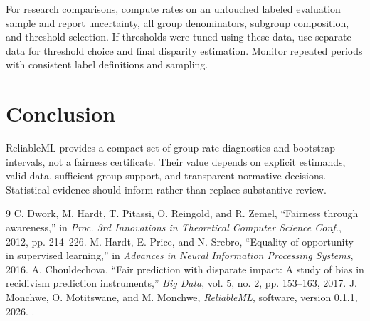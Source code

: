\documentclass[conference]{IEEEtran}
\begin{document}
For research comparisons, compute rates on an untouched labeled evaluation sample and report uncertainty, all group denominators, subgroup composition, and threshold selection. If thresholds were tuned using these data, use separate data for threshold choice and final disparity estimation. Monitor repeated periods with consistent label definitions and sampling.

\section{Conclusion}
ReliableML provides a compact set of group-rate diagnostics and bootstrap intervals, not a fairness certificate. Their value depends on explicit estimands, valid data, sufficient group support, and transparent normative decisions. Statistical evidence should inform rather than replace substantive review.

\begin{thebibliography}{9}
 C. Dwork, M. Hardt, T. Pitassi, O. Reingold, and R. Zemel, ``Fairness through awareness,'' in \emph{Proc. 3rd Innovations in Theoretical Computer Science Conf.}, 2012, pp. 214--226.
 M. Hardt, E. Price, and N. Srebro, ``Equality of opportunity in supervised learning,'' in \emph{Advances in Neural Information Processing Systems}, 2016.
 A. Chouldechova, ``Fair prediction with disparate impact: A study of bias in recidivism prediction instruments,'' \emph{Big Data}, vol. 5, no. 2, pp. 153--163, 2017.
 J. Monchwe, O. Motitswane, and M. Monchwe, \emph{ReliableML}, software, version 0.1.1, 2026. \projecturl.
\end{thebibliography}
\end{document}
